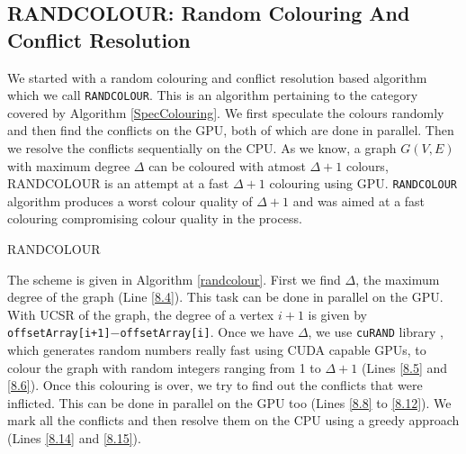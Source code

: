 \documentclass[MTech]{iitmdiss}
\makeatletter
\def\BState{\State\hskip-\ALG@thistlm}
\makeatother
\begin{document}
\subsection{RANDCOLOUR: Random Colouring And Conflict Resolution}
We started with a random colouring and conflict resolution based algorithm which we call \verb+RANDCOLOUR+. This is an algorithm pertaining to the category covered by Algorithm \ref{SpecColouring}. We first speculate the colours randomly and then find the conflicts on the GPU, both of which are done in parallel. Then we resolve the conflicts sequentially on the CPU. As we know, a graph $G(V,E)$ with maximum degree $\Delta$ can be coloured with atmost $\Delta+1$ colours, RANDCOLOUR is an attempt at a fast $\Delta+1$ colouring using GPU. \verb+RANDCOLOUR+ algorithm produces a worst colour quality of $\Delta+1$ and was aimed at a fast colouring compromising colour quality in the process. 

\begin{algorithm}
\caption{RANDCOLOUR}\label{randcolour}
\end{algorithm}

The scheme is given in Algorithm \ref{randcolour}. First we find $\Delta$, the maximum degree of the graph (Line \ref{8.4}). This task can be done in parallel on the GPU. With UCSR of the graph, the degree of a vertex $i+1$ is given by \verb|offsetArray[i+1]|$-$\verb+offsetArray[i]+. Once we have $\Delta$, we use \verb+cuRAND+ library \citep{nVidia:cuRAND}, which generates random numbers really fast using CUDA capable GPUs, to colour the graph with random integers ranging from 1 to $\Delta+1$ (Lines \ref{8.5} and \ref{8.6}). Once this colouring is over, we try to find out the conflicts that were inflicted. This can be done in parallel on the GPU too (Lines \ref{8.8} to \ref{8.12}). We mark all the conflicts and then resolve them on the CPU using a greedy approach (Lines \ref{8.14} and \ref{8.15}).
\end{document}
